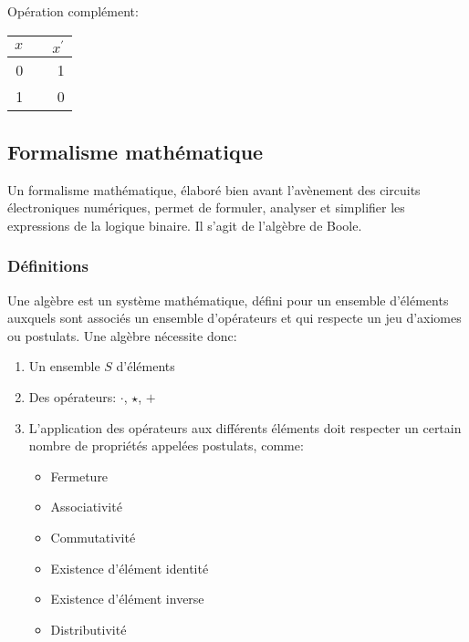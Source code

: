 \documentclass[11pt]{article}
\begin{document}
Opération complément:

\begin{center}
\begin{tabular}{rlr}
\(x\) &  & \(x^{\prime}\)\\[0pt]
\hline
0 &  & 1\\[0pt]
1 &  & 0\\[0pt]
\end{tabular}
\end{center}

\subsection{Formalisme mathématique}
\label{sec:org0238ee2}

Un formalisme mathématique, élaboré bien avant l'avènement des
circuits électroniques numériques, permet de formuler, analyser et
simplifier les expressions de la logique binaire. Il s'agit de
l'algèbre de Boole. 

\subsubsection{Définitions}
\label{sec:orgb031edc}

Une algèbre est un système mathématique, défini pour un ensemble
d'éléments auxquels sont associés un ensemble d'opérateurs et qui
respecte un jeu d'axiomes ou postulats. Une algèbre nécessite donc:

\begin{enumerate}
\item Un ensemble \(S\) d'éléments

\item Des opérateurs: \(\cdot\), \(\star\), \(+\)

\item L'application des opérateurs aux différents éléments doit respecter
un certain nombre de propriétés appelées postulats, comme:

\begin{itemize}
\item Fermeture

\item Associativité

\item Commutativité

\item Existence d'élément identité

\item Existence d'élément inverse

\item Distributivité
\end{itemize}
\end{enumerate}
\end{document}
